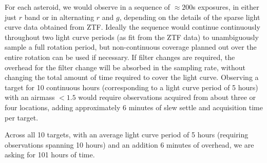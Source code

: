 \documentclass[11pt]{article}
\begin{document}
For each asteroid, we would observe in a sequence of $\approx200$s
exposures, in either just $r$ band or in alternating $r$ and $g$,
depending on the details of the sparse light curve data obtained from
ZTF. Ideally the sequence would continue continuously throughout two light curve periods
(as fit from the ZTF data) to unambiguously sample a full rotation
period, but non-continuous coverage planned out over the entire rotation 
can be used if necessary. If filter changes are required, the overhead for the filter change will
be absorbed in the sampling rate, without changing the total 
amount of time required to cover the light curve. Observing a target for 
10 continuous hours (corresponding to a light curve period of 5 hours) with an airmass $<1.5$
would require observations acquired from about three or four locations, adding approximately
6 minutes of slew settle and acquisition time per target.

Across all 10 targets, with an average light curve period of 5 hours (requiring observations
spanning 10 hours) and an addition 6 minutes of overhead, we are asking for 101 hours of time.


%
%

\begin{configuration}
\grating{}
\order{}
\crossdisperser{}       
\slit{}
\multislit{}            
\wstart{}
\wend{}
\cable{}
\corrector{}            
\collimator{}             
\adc{}
\end{configuration}
\end{document}
